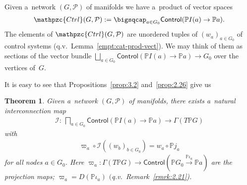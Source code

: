 \documentclass[pdftex]{sigma}
\numberwithin{equation}{section}
\newtheorem{Theorem}{Theorem}[section]
\begin{document}
\begin{Notation}
Given a~network $(G,{\mathcal P})$ of manifolds we have a~product of vector spaces
\begin{gather*}
\mathpzc{Ctrl}(G,{\mathcal P}):= \bigsqcap_{a\in G_0} \mathsf{Control}(\mathbb{P} I(a)\to \mathbb{P} a).
\end{gather*}
The elements of $\mathpzc{Ctrl}(G,{\mathcal P})$ are unordered tuples of $(w_a)_{a\in G_0}$ of control systems (q.v.\
Lem\-ma~\ref{empt:cat-prod-vect}).
We may think of them as sections of the vector bundle $\bigsqcup\limits_{a\in G_0}\mathsf{Control}(\mathbb{P} I(a)\to
\mathbb{P} a) \to G_0$ over the vertices of~$G$.
\end{Notation}
It is easy to see that Propositions~\ref{prop:3.2} and~\ref{prop:2.26} give us
\begin{Theorem}
\label{thm:3.8}
Given a~network $(G,{\mathcal P})$ of manifolds, there exists a~natural interconnection map
\begin{gather*}
\mathscr{I}\colon \ \bigsqcap_{a\in G_0} \mathsf{Control} (\mathbb{P} I(a)\to \mathbb{P} a) \to \Gamma (T\mathbb{P} G)
\end{gather*}
with
\begin{gather*}
\varpi_a \circ \mathscr{I} ((w_b)_{b\in G_0}) = w_a \circ \mathbb{P} j_a
\end{gather*}
for all nodes $a\in G_0$.
Here $\varpi_a\colon \Gamma (T\mathbb{P} G) \to \mathsf{Control}(\mathbb{P} G_0 \xrightarrow{\mathbb{P} \iota_a}
\mathbb{P} a)$ are the projection maps; $\varpi_a = D (\mathbb{P} \iota_a)$ $($q.v.~Remark~{\rm \ref{rmrk:2.21})}.
\end{Theorem}
\end{document}
